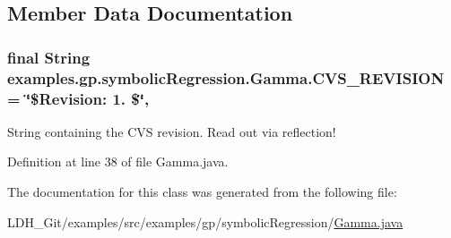 \subsection{Member Data Documentation}
\hypertarget{classexamples_1_1gp_1_1symbolic_regression_1_1_gamma_a2e446473c391d3b33464ddabd889c19f}{
\subsubsection[{C\-V\-S\-\_\-\-R\-E\-V\-I\-S\-I\-O\-N}]{\setlength{\rightskip}{0pt plus 5cm}final String examples.\-gp.\-symbolic\-Regression.\-Gamma.\-C\-V\-S\-\_\-\-R\-E\-V\-I\-S\-I\-O\-N = \char`\"{}\$Revision\-: 1. \$\char`\"{}\hspace{0.3cm}{\ttfamily [static]}, {\ttfamily [private]}}}\label{classexamples_1_1gp_1_1symbolic_regression_1_1_gamma_a2e446473c391d3b33464ddabd889c19f}
String containing the C\-V\-S revision. Read out via reflection! 

Definition at line 38 of file Gamma.\-java.



The documentation for this class was generated from the following file\-:\begin{DoxyCompactItemize}
\item 
L\-D\-H\-\_\-\-Git/examples/src/examples/gp/symbolic\-Regression/\hyperlink{_gamma_8java}{Gamma.\-java}\end{DoxyCompactItemize}
